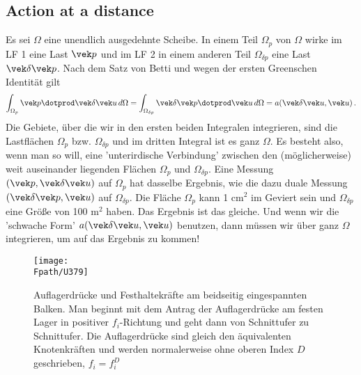 {{%
\textcolor{blau2}{\section{Action at a distance}}
Es sei $\Omega$ eine unendlich ausgedehnte Scheibe. In einem Teil $\Omega_p$ von $\Omega$ wirke im LF 1 eine Last $\vek p$ und im LF 2 in einem anderen Teil $\Omega_{\delta p}$ eine Last $\vek \delta \vek p$. Nach dem Satz von Betti und wegen der ersten Greenschen Identit\"{a}t gilt
\begin{align} \label{Eq147}
\int_{\Omega_p} \vek p \dotprod  \vek \delta \vek u\,d\Omega = \int_{\Omega_{\delta p}}\vek \delta \vek p \dotprod  \vek u\,d\Omega = a(\vek \delta \vek u, \vek u)\,.
\end{align}
Die Gebiete, \"{u}ber die wir in den ersten beiden Integralen integrieren, sind die Lastfl\"{a}chen $\Omega_p$ bzw. $\Omega_{\delta p}$ und im dritten Integral ist es ganz $\Omega$. Es besteht also, wenn man so will, eine 'unterirdische Verbindung' zwischen den (m\"{o}glicherweise) weit auseinander liegenden Fl\"{a}chen $\Omega_p$ und $\Omega_{\delta p}$. Eine Messung $(\vek p, \vek \delta \vek u)$ auf $\Omega_p$ hat dasselbe Ergebnis, wie die dazu duale Messung $(\vek \delta \vek p, \vek u)$ auf $\Omega_{\delta p}$. Die Fl\"{a}che $\Omega_p$ kann 1 cm$^2$ im Geviert sein und $\Omega_{\delta p}$ eine Gr\"{o}{\ss}e von 100 m$^2$ haben. Das Ergebnis ist das gleiche. Und wenn wir die 'schwache Form' $a(\vek \delta \vek u, \vek u)$ benutzen, dann m\"{u}ssen wir \"{u}ber ganz $\Omega$ integrieren, um auf das Ergebnis zu kommen!


\begin{figure}[tbp]
\centering
\if {} \sidecaption \fi
\texttt{[image: \\Fpath/U379]}
\caption{Auflagerdr\"{u}cke und Festhaltekr\"{a}fte am beidseitig eingespannten Balken. Man beginnt mit dem Antrag der Auflagerdr\"{u}cke am festen Lager in positiver $f_i$-Richtung und geht dann von Schnittufer zu Schnittufer. Die Auflagerdr\"{u}cke sind gleich den \"{a}quivalenten Knotenkr\"{a}ften und werden normalerweise ohne oberen Index $D$ geschrieben, $f_i = f_i^D$} \label{U379}
\end{figure}%

}}
